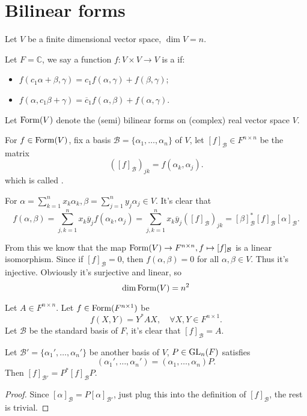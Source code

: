 \section{Bilinear forms}
\label{sec:Bilinear forms}
Let $V$ be a finite dimensional vector space, $\dim V = n$.
\begin{definition}
	Let $F = \mathbb{C}$, we say a function $f: V\times V \to V$ is
	a  if:
	\begin{itemize}
		\item $f(c_1\alpha + \beta, \gamma) = c_1f(\alpha, \gamma) + f(\beta, \gamma)$;
		\item $f(\alpha, c_1\beta + \gamma) = \overline{c}_1f(\alpha, \beta)+f(\alpha, \gamma)$.
	\end{itemize}

	Let $\operatorname{Form}(V)$ denote the (semi) bilinear forms on (complex) real vector space $V$.
\end{definition}

For $f \in \operatorname{Form}(V)$, fix a basis $\mathcal{B} = \{\alpha_1,\dots, \alpha_n\}$ of $V$,
let $[f]_{\mathcal{B}}\in F^{n\times n}$ be the matrix
\[
	([f]_{\mathcal{B}})_{jk} = f(\alpha_k, \alpha_j).
\]
which is called .

For $\alpha = \sum_{k=1}^{n} x_k\alpha_k, \beta = \sum_{j=1}^{n} y_j\alpha_j\in V$.
It's clear that
\[
f(\alpha, \beta) = \sum_{j, k = 1}^{n} x_k \overline{y}_j f(\alpha_k, \alpha_j)
= \sum_{j, k = 1}^{n} x_k \overline{y}_j ([f]_{\mathcal{B}})_{jk}
= [\beta]_{\mathcal{B}}^* [f]_{\mathcal{B}} [\alpha]_{\mathcal{B}}.
\]

From this we know that the map $\operatorname{Form}(V) \to F^{n\times n}, f\mapsto [f]_{\mathcal{B}}$
is a linear isomorphism.
Since if $[f]_{\mathcal{B}} = 0$, then $f(\alpha, \beta) = 0$ for all $\alpha, \beta\in V$.
Thus it's injective. Obviously it's surjective and linear,
so
\[
	\dim \operatorname{Form}(V) = n^2
\]

\begin{example}
    Let $A\in F^{n\times n}$. Let $f\in \operatorname{Form}(F^{n\times 1})$ be
	\[
	f(X, Y) = Y^*AX, \quad \forall X, Y\in F^{n\times 1}.
	\]
	Let $\mathcal{B}$ be the standard basis of $F$,
	it's clear that $[f]_{\mathcal{B}} = A$.
\end{example}
\begin{proposition}
	Let $\mathcal{B}' = \{\alpha_1', \dots, \alpha_n'\}$ be another basis of $V$,
	$P\in \mathrm{GL}_n(F)$ satisfies
	\[
		(\alpha_1',\dots, \alpha_n') = (\alpha_1, \dots, \alpha_n) P.
	\]
	Then $[f]_{\mathcal{B}'} = P^*[f]_{\mathcal{B}}P$.
\end{proposition}
\begin{proof}[Proof]
	Since $[\alpha]_{\mathcal{B}} = P[\alpha]_{\mathcal{B}'}$,
	just plug this into the definition of $[f]_{\mathcal{B}}$, the rest is trivial.
\end{proof}

